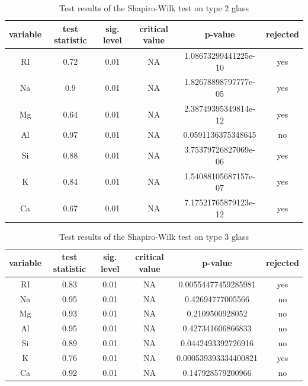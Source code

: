 \documentclass[a4paper, 12pt, titlepage, headsepline, listof = totoc, bibliography = totoc, numbers = noenddot]{scrartcl}
\begin{document}
\begin{table}[h!]
\centering
\begin{tabular}{|cccccc|} \hline variable & test statistic & sig. level & critical value & p-value & rejected\\ \hline RI & 0.72 & 0.01 & NA & 1.08673299441225e-10 & yes\\ 
Na & 0.9 & 0.01 & NA & 1.82678898797777e-05 & yes\\ 
Mg & 0.64 & 0.01 & NA & 2.38749395349814e-12 & yes\\ 
Al & 0.97 & 0.01 & NA & 0.0591136375348645 & no\\ 
Si & 0.88 & 0.01 & NA & 3.75379726827069e-06 & yes\\ 
K & 0.84 & 0.01 & NA & 1.54088105687157e-07 & yes\\ 
Ca & 0.67 & 0.01 & NA & 7.17521765879123e-12 & yes\\ \hline \end{tabular}\caption{Test results of the Shapiro-Wilk test on type 2 glass}
\label{tab:testrestype2SW}
\end{table}

\begin{table}[h!]
\centering
\begin{tabular}{|cccccc|} \hline variable & test statistic & sig. level & critical value & p-value & rejected\\ \hline RI & 0.83 & 0.01 & NA & 0.00554477459285981 & yes\\ 
Na & 0.95 & 0.01 & NA & 0.42694777005566 & no\\ 
Mg & 0.93 & 0.01 & NA & 0.2109500928052 & no\\ 
Al & 0.95 & 0.01 & NA & 0.427341606866833 & no\\ 
Si & 0.89 & 0.01 & NA & 0.0442493392726916 & no\\ 
K & 0.76 & 0.01 & NA & 0.000539393334400821 & yes\\ 
Ca & 0.92 & 0.01 & NA & 0.147928579200966 & no\\ \hline \end{tabular}\caption{Test results of the Shapiro-Wilk test on type 3 glass}
\label{tab:testrestype3SW}
\end{table}
\end{document}
